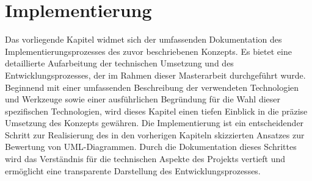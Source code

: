\chapter{Implementierung}

Das vorliegende Kapitel widmet sich der umfassenden Dokumentation des Implementierungsprozesses des zuvor beschriebenen Konzepts. Es bietet eine detaillierte Aufarbeitung der technischen Umsetzung und des Entwicklungsprozesses, der im Rahmen dieser Masterarbeit durchgeführt wurde. Beginnend mit einer umfassenden Beschreibung der verwendeten Technologien und Werkzeuge sowie einer ausführlichen Begründung für die Wahl dieser spezifischen Technologien, wird dieses Kapitel einen tiefen Einblick in die präzise Umsetzung des Konzepts gewähren. Die Implementierung ist ein entscheidender Schritt zur Realisierung des in den vorherigen Kapiteln skizzierten Ansatzes zur Bewertung von UML-Diagrammen. Durch die Dokumentation dieses Schrittes wird das Verständnis für die technischen Aspekte des Projekts vertieft und ermöglicht eine transparente Darstellung des Entwicklungsprozesses.